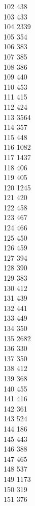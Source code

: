 { 102	438 \\
 103	433 \\
 104	2339 \\
 105	354 \\
 106	383 \\
 107	385 \\
 108	386 \\
 109	440 \\
 110	453 \\
 111	415 \\
 112	424 \\
 113	3564 \\
 114	357 \\
 115	448 \\
 116	1082 \\
 117	1437 \\
 118	406 \\
 119	405 \\
 120	1245 \\
 121	420 \\
 122	458 \\
 123	467 \\
 124	466 \\
 125	450 \\
 126	459 \\
 127	394 \\
 128	390 \\
 129	383 \\
 130	412 \\
 131	439 \\
 132	441 \\
 133	449 \\
 134	350 \\
 135	2682 \\
 136	330 \\
 137	350 \\
 138	412 \\
 139	368 \\
 140	455 \\
 141	416 \\
 142	361 \\
 143	524 \\
 144	186 \\
 145	443 \\
 146	388 \\
 147	465 \\
 148	537 \\
 149	1173 \\
 150	319 \\
 151	376 \\
}

